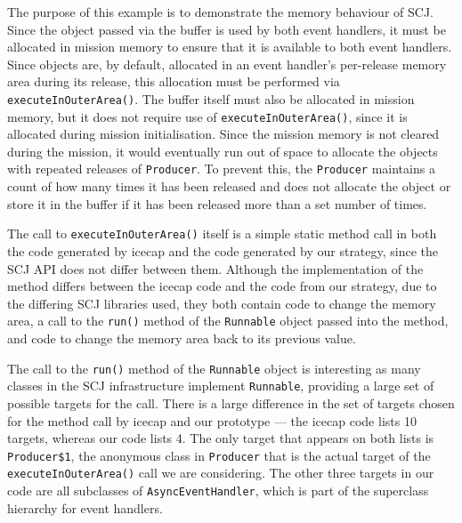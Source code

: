 The purpose of this example is to demonstrate the memory behaviour of
SCJ.
Since the object passed via the buffer is used by both event handlers,
it must be allocated in mission memory to ensure that it is available
to both event handlers.
Since objects are, by default, allocated in an event handler's
per-release memory area during its release, this allocation must be
performed via \texttt{executeInOuterArea()}.
The buffer itself must also be allocated in mission memory, but it
does not require use of \texttt{executeInOuterArea()}, since it is
allocated during mission initialisation.
Since the mission memory is not cleared during the mission, it would
eventually run out of space to allocate the objects with repeated
releases of \texttt{Producer}.
To prevent this, the \texttt{Producer} maintains a count of how many
times it has been released and does not allocate the object or store
it in the buffer if it has been released more than a set number of
times.

The call to \texttt{executeInOuterArea()} itself is a simple static
method call in both the code generated by icecap and the code
generated by our strategy, since the SCJ API does not differ between
them.
Although the implementation of the method differs between the icecap
code and the code from our strategy, due to the differing SCJ
libraries used, they both contain code to change the memory area, a
call to the \texttt{run()} method of the \texttt{Runnable} object
passed into the method, and code to change the memory area back to its
previous value.

The call to the \texttt{run()} method of the \texttt{Runnable} object
is interesting as many classes in the SCJ infrastructure implement
\texttt{Runnable}, providing a large set of possible targets for the
call.
There is a large difference in the set of targets chosen for the
method call by icecap and our prototype --- the icecap code lists 10
targets, whereas our code lists 4.
The only target that appears on both lists is \texttt{Producer\$1},
the anonymous class in \texttt{Producer} that is the actual target of
the \texttt{executeInOuterArea()} call we are considering.
The other three targets in our code are all subclasses of
\texttt{AsyncEventHandler}, which is part of the superclass hierarchy
for event handlers. 

